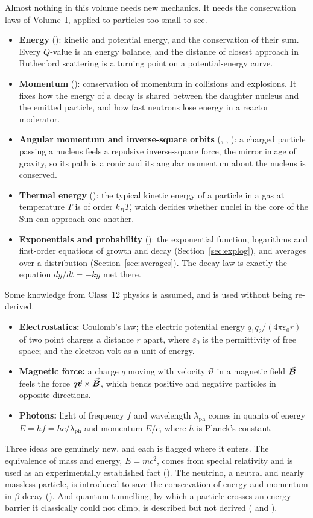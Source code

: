 Almost nothing in this volume needs new mechanics. It needs the conservation laws of Volume~I, applied
to particles too small to see.
\begin{itemize}
\item \textbf{Energy} (): kinetic and potential energy, and the conservation of their
sum. Every $Q$-value is an energy balance, and the distance of closest approach in Rutherford scattering is
a turning point on a potential-energy curve.
\item \textbf{Momentum} (): conservation of momentum in collisions and explosions.
It fixes how the energy of a decay is shared between the daughter nucleus and the emitted particle, and
how fast neutrons lose energy in a reactor moderator.
\item \textbf{Angular momentum and inverse-square orbits} (, ,
): a charged particle passing a nucleus feels a repulsive inverse-square force, the
mirror image of gravity, so its path is a conic and its angular momentum about the nucleus is conserved.
\item \textbf{Thermal energy} (): the typical kinetic energy of a particle in a gas at
temperature $T$ is of order $k_BT$, which decides whether nuclei in the core of the Sun can approach one
another.
\item \textbf{Exponentials and probability} (): the exponential function, logarithms and
first-order equations of growth and decay (Section~\ref{sec:explog}), and averages over a distribution
(Section~\ref{sec:averages}). The decay law is exactly the equation $dy/dt=-ky$ met there.
\end{itemize}

Some knowledge from Class~12 physics is assumed, and is used without being re-derived.
\begin{itemize}
\item \textbf{Electrostatics:} Coulomb's law; the electric potential energy $q_1q_2/(4\pi\varepsilon_0r)$
of two point charges a distance $r$ apart, where $\varepsilon_0$ is the permittivity of free space; and
the electron-volt as a unit of energy.
\item \textbf{Magnetic force:} a charge $q$ moving with velocity $\vec{\bm{v}}$ in a magnetic field $\vec{\bm{B}}$ feels the
force $q\vec{\bm{v}}\times\vec{\bm{B}}$, which bends positive and negative particles in opposite directions.
\item \textbf{Photons:} light of frequency $f$ and wavelength $\lambda_{\text{ph}}$ comes in quanta of
energy $E=hf=hc/\lambda_{\text{ph}}$ and momentum $E/c$, where $h$ is Planck's constant.
\end{itemize}
Three ideas are genuinely new, and each is flagged where it enters. The equivalence of mass and energy,
$E=mc^2$, comes from special relativity and is used as an experimentally established fact
(). The neutrino, a neutral and nearly massless particle, is introduced to save the
conservation of energy and momentum in $\beta$ decay (). And quantum tunnelling, by which
a particle crosses an energy barrier it classically could not climb, is described but not derived
( and ).

